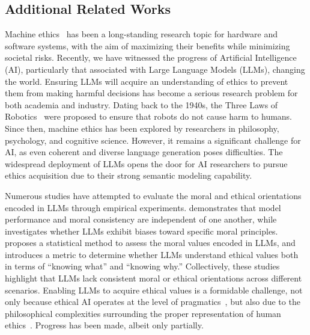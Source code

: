 
\subsection{Additional Related Works\label{sec:relatedworks}}
Machine ethics~\cite{anderson2011machine,tolmeijer2020implementations,nath2020problem,allen2006machine} has been a long-standing research topic for hardware and software systems, with the aim of maximizing their benefits while minimizing societal risks.
Recently, we have witnessed the progress of Artificial Intelligence (AI), particularly that associated with Large Language Models (LLMs), changing the world.
Ensuring LLMs will acquire an understanding of ethics to prevent them from making harmful decisions has become a serious research problem for both academia and industry.
Dating back to the 1940s, the Three Laws of Robotics~\cite{asimov1941three} were proposed to ensure that robots do not cause harm to humans.
Since then, machine ethics has been explored by researchers in philosophy, psychology, and cognitive science. However, it remains a significant challenge for AI, as even coherent and diverse language generation poses difficulties.
The widespread deployment of LLMs opens the door for AI researchers to pursue ethics acquisition due to their strong semantic modeling capability. 

Numerous studies have attempted to evaluate the moral and ethical orientations encoded in LLMs through empirical experiments. \citet{bonagiri2024sage} demonstrates that model performance and moral consistency are independent of one another, while \citet{abdulhai2023moral} investigates whether LLMs exhibit biases toward specific moral principles. \citet{scherrer2024evaluating} proposes a statistical method to assess the moral values encoded in LLMs, and \citet{zhang2023measuring} introduces a metric to determine whether LLMs understand ethical values both in terms of “knowing what” and “knowing why.” Collectively, these studies highlight that LLMs lack consistent moral or ethical orientations across different scenarios.
Enabling LLMs to acquire ethical values is a formidable challenge, not only because ethical AI operates at the level of pragmatics~\cite{awad2022computational}, but also due to the philosophical complexities surrounding the proper representation of human ethics~\cite{zhixuan2024preferencesaialignment}. Progress has been made, albeit only partially. 


